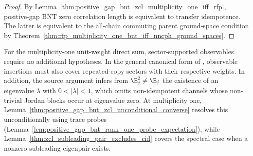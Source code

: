 \begin{proof}
    \leanok
    By Lemma~\ref{thm:positive_gap_bnt_zcl_multiplicity_one_iff_rfp},
    positive-gap BNT zero correlation length is equivalent to transfer
    idempotence. The latter is equivalent to the all-chain commuting parent
    ground-space condition by
    Theorem~\ref{thm:rfp_multiplicity_one_bnt_iff_nncph_ground_spaces}.
\end{proof}

\begin{remark}
    For the multiplicity-one unit-weight direct sum, sector-supported
    observables require no additional hypotheses. In the general canonical
    form of \cite[equations~(1252) and~(1256)]{Cirac2016MPDO_arXiv}, observable
    insertions must also cover repeated-copy sectors with their respective
    weights. In addition, the source argument infers from $\E_j^2\ne\E_j$ the
    existence of an eigenvalue $\lambda$ with $0<|\lambda|<1$, which omits
    non-idempotent channels whose non-trivial Jordan blocks occur at eigenvalue
    zero. At multiplicity one,
    Lemma~\ref{thm:positive_gap_bnt_zcl_unconditional_converse} resolves this
    unconditionally using trace probes
    (Lemma~\ref{lem:positive_gap_bnt_rank_one_probe_expectation}), while
    Lemma~\ref{thm:zcl_subleading_pair_excludes_cid} covers the spectral
    case when a nonzero subleading eigenpair exists.
\end{remark}
